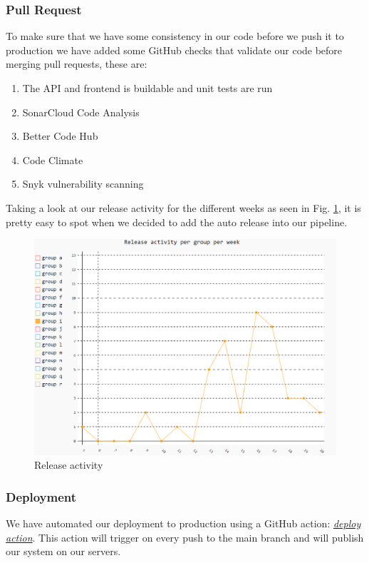 \documentclass[10pt]{article}
\begin{document}
\subsubsection{Pull Request}
To make sure that we have some consistency in our code before we push it to production we have added some GitHub checks that validate our code before merging pull requests, these are:
\begin{enumerate}
    \item The API and frontend is buildable and unit tests are run
    \item SonarCloud Code Analysis
    \item Better Code Hub
    \item Code Climate
    \item Snyk vulnerability scanning
\end{enumerate}
Taking a look at our release activity for the different weeks as seen in Fig. \ref{fig:release_activity}, it is  pretty easy to spot when we decided to add the auto release into our pipeline.
\begin{figure}[H]
    \centering
    \includegraphics[width=\textwidth]{images/ReleaseActivity.PNG}
    \caption{Release activity}
    \label{fig:release_activity}
\end{figure}
\subsubsection{Deployment}
We have automated our deployment to production using a GitHub action: 
\href{https://github.com/Arklaide/devopsITUproject/blob/main/.github/workflows/deploy.yaml}{\textit{deploy action}}.
This action will trigger on every push to the main branch and will publish our system on our servers. 
\end{document}
